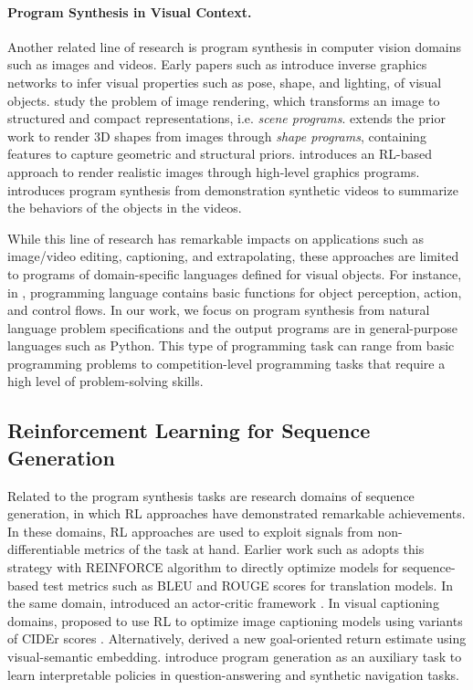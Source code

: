 \documentclass{article}
\begin{document}
\paragraph{Program Synthesis in Visual Context.}
Another related line of research is program synthesis in computer vision domains such as images and videos. 
Early papers such as \citep{kulkarni2015deep, yang2015weakly} introduce inverse graphics networks to infer visual properties such as pose, shape, and lighting, of visual objects. 
\cite{Wu_2017_CVPR, liu2018learning, ellis2018learning} study the problem of image rendering, which transforms an image to structured and compact representations, i.e. \emph{scene programs}. 
\cite{tian2018learning} extends the prior work to render 3D shapes from images through \emph{shape programs}, containing features to capture geometric and structural priors. 
\cite{ganin2018synthesizing} introduces an RL-based approach to render realistic images through high-level graphics programs.
\cite{pmlr-v80-sun18a}introduces program synthesis from demonstration synthetic videos to summarize the behaviors of the objects in the videos. 

While this line of research has remarkable impacts on applications such as image/video editing, captioning, and extrapolating, these approaches are limited to programs of domain-specific languages defined for visual objects. 
For instance, in \citep{pmlr-v80-sun18a}, programming language contains basic functions for object perception, action, and control flows.
In our work, we focus on program synthesis from natural language problem specifications and the output programs are in general-purpose languages such as Python. 
This type of programming task can range from basic programming problems to competition-level programming tasks that require a high level of problem-solving skills. 

\subsection{Reinforcement Learning for Sequence Generation}
Related to the program synthesis tasks are research domains of sequence generation, in which RL approaches have demonstrated remarkable achievements. 
In these domains, RL approaches are used to exploit signals from non-differentiable metrics of the task at hand.
Earlier work such as \citep{DBLP:journals/corr/RanzatoCAZ15} adopts this strategy with REINFORCE algorithm \citep{williams1992simple} to directly optimize models for sequence-based test metrics such as BLEU \citep{papineni2002bleu} and ROUGE \citep{lin2004rouge} scores for translation models. 
In the same domain, \cite{bahdanau2016actor} introduced an actor-critic framework \citep{sutton1984temporal, konda1999actor}.
In visual captioning domains, \cite{rennie2017self, wang2018video} proposed to use RL to optimize image captioning models using variants of CIDEr scores \citep{vedantam2015cider}. 
Alternatively, \cite{ren2017deep} derived a new goal-oriented return estimate using visual-semantic embedding. 
\citet{johnson2017inferring, trivedi2021learning} introduce program generation as an auxiliary task to learn interpretable policies in question-answering and synthetic navigation tasks. 
\end{document}
